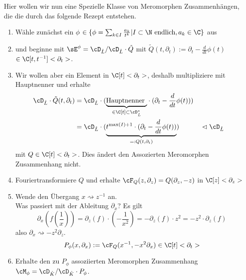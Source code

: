 \begin{comment}
\cite[5.b.]{sabbah_Fourier-local}
\end{comment}
Hier wollen wir nun eine Spezielle Klasse von Meromorphen Zusammenhängen, die
die durch das folgende Rezept entstehen.
\begin{enumerate}
\item Wähle zunächst ein $\phi$
$\in\{\phi=\sum_{k\in I}\frac{a_k}{t^{k}}|I\subset\N\mbox{ endlich},a_k\in \C\}$
aus
\item und beginne mit $\sE^{\phi}=\cD_{\hat L}/\cD_{\hat L}\cdot \tilde Q$
mit
$ \tilde Q(t,\partial_t):=\partial_t-\frac{d}{dt}\phi(t)$
$\in\C[t,t^{-1}]<\partial_t>$.
\item Wir wollen aber ein Element in $\C[t]<\partial_t>$,
deshalb multipliziere mit Hauptnenner und erhalte
\begin{align*}
\cD_{\hat L}\cdot \tilde Q(t,\partial_t)
  &=\cD_{\hat L}\cdot (\underset{\in\C[t]\subset\cD_{\hat L}^*}
    {\underbrace{\mbox{Hauptnenner }}}
  \cdot (\partial_t-\frac{d}{dt}\phi(t))) \\
&=\cD_{\hat L}\cdot ( \underset{=:Q(t,\partial_t)}{\underbrace{
  t^{\max(I)+1} \cdot (\partial_t-\frac{d}{dt}\phi(t))}}) 
  & & \vartriangleleft\cD_{\hat L}
\end{align*}
mit $Q\in\C[t]<\partial_t>$.
Dies ändert den Assozierten Meromorphen Zusammenhang nicht.
\begin{comment}
Lemma?
\end{comment}
\item Fouriertransformiere $Q$ und erhalte
$\cF_Q(z,\partial_z)=Q(\partial_z,-z)$ in $\C[z]<\partial_z>$
\item Wende den Übergang $x\rightsquigarrow z^{-1}$ an.\\
Was passiert mit der Ableitung $\partial_x$? Es gilt
\[
\partial_x (f(\frac{1}{x}))=
\partial_z(f)\cdot (-\frac{1}{x^2})=
-\partial_z(f)\cdot z^2= %
- z^2 \cdot \partial_z(f)
\]
also $ \partial_x\rightsquigarrow-z^2\partial_z $.
\[
P_\phi(x,\partial_x):=\cF_Q(x^{-1},-x^2\partial_x) \in \C[t]<\partial_t>
\]
\item Erhalte den zu $P_\phi$ assoziierten Meromorphen Zusammenhang
$\cM_\phi=\cD_{\hat K}/\cD_{\hat K}\cdot P_{\phi}$.
\end{enumerate}

\begin{comment}
warum sind diese wichtig??
\end{comment}


